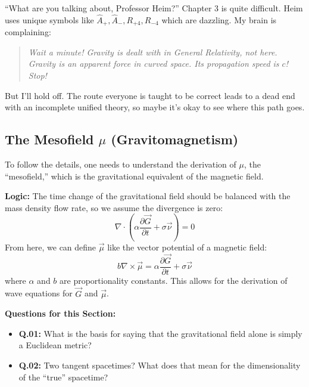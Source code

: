 \documentclass[11pt,a4paper,oneside]{article}
\newenvironment{fancyquote}
    {\begin{quote}\itshape\color{theoryblue!80!black}\guillemotleft\;}
    {\;\guillemotright\end{quote}}
\begin{document}
\begin{reflectionbox}[title={Notes and Reflections: The Brain Complains}]
``What are you talking about, Professor Heim?'' Chapter 3 is quite difficult. Heim uses unique symbols like $\hat{A}_{+}, \hat{A}_{-}, R_{+4}, R_{-4}$ which are dazzling. My brain is complaining:
\begin{fancyquote}
    \textit{Wait a minute! Gravity is dealt with in General Relativity, not here. Gravity is an apparent force in curved space. Its propagation speed is $c$! Stop!}
\end{fancyquote}
But I'll hold off. The route everyone is taught to be correct leads to a dead end with an incomplete unified theory, so maybe it's okay to see where this path goes.
\end{reflectionbox}

\subsection{The Mesofield \texorpdfstring{$\mu$}{mu} (Gravitomagnetism)}

To follow the details, one needs to understand the derivation of $\mu$, the ``mesofield,'' which is the gravitational equivalent of the magnetic field.

\textbf{Logic:} The time change of the gravitational field should be balanced with the mass density flow rate, so we assume the divergence is zero:
\begin{equation}
    \nabla \cdot \left( \alpha \frac{\partial \vec{G}}{\partial t} + \sigma \vec{\nu} \right) = 0
\end{equation}
From here, we can define $\vec{\mu}$ like the vector potential of a magnetic field:
\begin{equation}
    b \nabla \times \vec{\mu} = \alpha \frac{\partial \vec{G}}{\partial t} + \sigma \vec{\nu}
\end{equation}
where $\alpha$ and $b$ are proportionality constants. This allows for the derivation of wave equations for $\vec{G}$ and $\vec{\mu}$.

\bigskip
\textbf{Questions for this Section:}
\begin{itemize}
    \item[\fbox{?}] \textbf{Q.01:} What is the basis for saying that the gravitational field alone is simply a Euclidean metric?
    \item[\fbox{?}] \textbf{Q.02:} Two tangent spacetimes? What does that mean for the dimensionality of the ``true'' spacetime?
\end{itemize}
\end{document}
